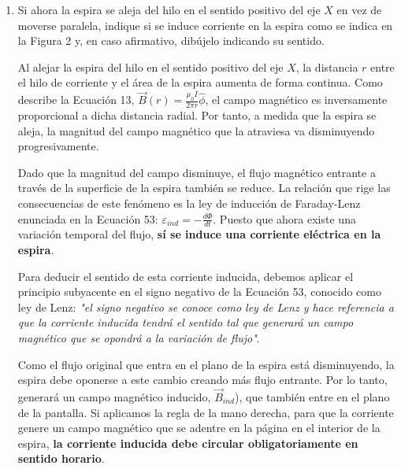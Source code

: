 \documentclass[11pt, a4paper]{article}
\newenvironment{problem}[1][Cuestión]{
	\vspace{0.5cm}
	\noindent{\Large\bfseries #1} \par\vspace{0.5cm}
}{
	\vspace{0.5cm}
}
\begin{document}
\begin{problem}[Cuestión 3]
\begin{enumerate}[label=\alph*)]
			\item Si ahora la espira se aleja del hilo en el sentido positivo del eje $X$ en vez de moverse paralela, indique si se induce corriente en la espira como se indica en la Figura 2 y, en caso afirmativo, dibújelo indicando su sentido.

				{ \color{blue}
					Al alejar la espira del hilo en el sentido positivo del eje $X$, la distancia $r$ entre el hilo de corriente y el área de la espira aumenta de forma continua. Como describe la Ecuación 13, $\vec{B}(r) = \frac{\mu_0 I}{2\pi r} \hat{\phi}$, el campo magnético es inversamente proporcional a dicha distancia radial. Por tanto, a medida que la espira se aleja, la magnitud del campo magnético que la atraviesa va disminuyendo progresivamente.

					Dado que la magnitud del campo disminuye, el flujo magnético entrante a través de la superficie de la espira también se reduce. La relación que rige las consecuencias de este fenómeno es la ley de inducción de Faraday-Lenz enunciada en la Ecuación 53: $\varepsilon_{ind} = - \frac{d\Phi}{dt}$. Puesto que ahora existe una variación temporal del flujo, \textbf{sí se induce una corriente eléctrica en la espira}.

					Para deducir el sentido de esta corriente inducida, debemos aplicar el principio subyacente en el signo negativo de la Ecuación 53, conocido como ley de Lenz: \textit{"el signo negativo se conoce como ley de Lenz y hace referencia a que la corriente inducida tendrá el sentido tal que generará un campo magnético que se opondrá a la variación de flujo"}. 

					Como el flujo original que entra en el plano de la espira está disminuyendo, la espira debe oponerse a este cambio creando más flujo entrante. Por lo tanto, generará un campo magnético inducido, $\vec{B}_{ind}$), que también entre en el plano de la pantalla. Si aplicamos la regla de la mano derecha, para que la corriente genere un campo magnético que se adentre en la página en el interior de la espira, \textbf{la corriente inducida debe circular obligatoriamente en sentido horario}.

					\begin{figure}[H]
						\centering
\end{figure}}
\end{enumerate}
\end{problem}
\end{document}
